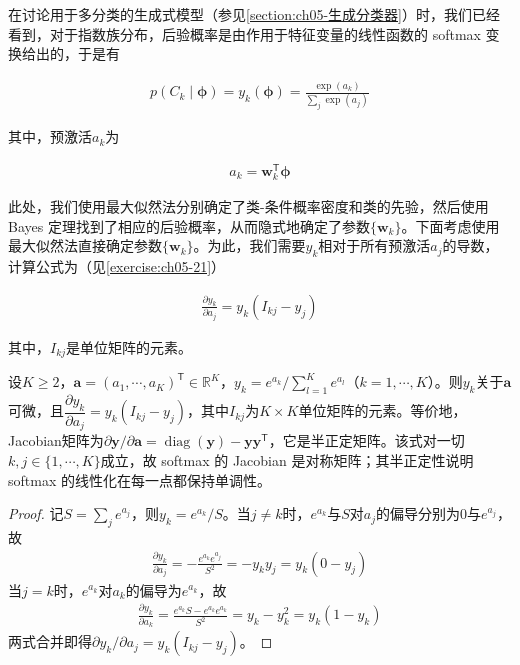 \documentclass[../../main.tex]{subfiles}
\begin{document}
在讨论用于多分类的生成式模型（参见\cref{section:ch05-生成分类器}）时，我们已经看到，对于指数族分布，后验概率是由作用于特征变量的线性函数的 softmax 变换给出的，于是有

\begin{align}
  p(C_k\mid\boldsymbol{\phi})=y_k(\boldsymbol{\phi})=\frac{\exp(a_k)}{\sum_j\exp(a_j)}
  \label{align:ch05-多类后验}
\end{align}

其中，预激活$a_k$为

\begin{align}
  a_k=\boldsymbol{w}_k^{\mathsf{T}}\boldsymbol{\phi}
  \label{align:ch05-多类线性预激活}
\end{align}

此处，我们使用最大似然法分别确定了类-条件概率密度和类的先验，然后使用 Bayes 定理找到了相应的后验概率，从而隐式地确定了参数$\{\boldsymbol{w}_k\}$。下面考虑使用最大似然法直接确定参数$\{\boldsymbol{w}_k\}$。为此，我们需要$y_k$相对于所有预激活$a_j$的导数，计算公式为（见\cref{exercise:ch05-21}）

\begin{align}
  \frac{\partial y_k}{\partial a_j}=y_k\left(I_{kj}-y_j\right)
  \label{align:ch05-softmax导数式}
\end{align}

其中，$I_{kj}$是单位矩阵的元素。

\begin{proposition}\label{proposition:ch05-softmax导数}
设$K\geqslant2$，$\boldsymbol{a}=(a_1,\cdots,a_K)^{\mathsf{T}}\in\mathbb{R}^{K}$，$y_k=e^{a_k}/\sum_{l=1}^{K}e^{a_l}$（$k=1,\cdots,K$）。则$y_k$关于$\boldsymbol{a}$可微，且$\dfrac{\partial y_k}{\partial a_j}=y_k(I_{kj}-y_j)$，其中$I_{kj}$为$K\times K$单位矩阵的元素。等价地，Jacobian矩阵为$\partial\boldsymbol{y}/\partial\boldsymbol{a}=\operatorname{diag}(\boldsymbol{y})-\boldsymbol{y}\boldsymbol{y}^{\mathsf{T}}$，它是半正定矩阵。该式对一切$k,j\in\{1,\cdots,K\}$成立，故 softmax 的 Jacobian 是对称矩阵；其半正定性说明 softmax 的线性化在每一点都保持单调性。
\end{proposition}

\begin{proof}
记$S=\sum_j e^{a_j}$，则$y_k=e^{a_k}/S$。当$j\neq k$时，$e^{a_k}$与$S$对$a_j$的偏导分别为0与$e^{a_j}$，故
\begin{align}
  \frac{\partial y_k}{\partial a_j}=-\frac{e^{a_k}e^{a_j}}{S^{2}}=-y_ky_j=y_k(0-y_j)
\end{align}
当$j=k$时，$e^{a_k}$对$a_k$的偏导为$e^{a_k}$，故
\begin{align}
  \frac{\partial y_k}{\partial a_k}=\frac{e^{a_k}S-e^{a_k}e^{a_k}}{S^{2}}=y_k-y_k^{2}=y_k(1-y_k)
\end{align}
两式合并即得$\partial y_k/\partial a_j=y_k(I_{kj}-y_j)$。
\end{proof}
\end{document}

